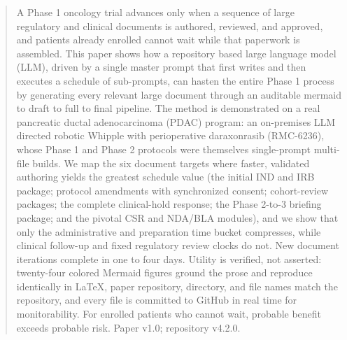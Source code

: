 \begin{abstract}
\noindent
A Phase 1 oncology trial advances only when a sequence of large regulatory and
clinical documents is authored, reviewed, and approved, and patients already
enrolled cannot wait while that paperwork is assembled. This paper shows how a
repository based large language model (LLM), driven by a single master prompt that
first writes and then executes a schedule of sub-prompts, can hasten the entire
Phase 1 process by generating every relevant large document through an auditable
mermaid to draft to full to final pipeline. The method is demonstrated on a real
pancreatic ductal adenocarcinoma (PDAC) program: an on-premises LLM directed
robotic Whipple with perioperative daraxonrasib (RMC-6236), whose Phase 1 and
Phase 2 protocols were themselves single-prompt multi-file builds. We map the six
document targets where faster, validated authoring yields the greatest schedule
value (the initial IND and IRB package; protocol amendments with synchronized
consent; cohort-review packages; the complete clinical-hold response; the
Phase 2-to-3 briefing package; and the pivotal CSR and NDA/BLA modules), and we
show that only the administrative and preparation time bucket compresses, while
clinical follow-up and fixed regulatory review clocks do not. New document
iterations complete in one to four days. Utility is verified, not asserted:
twenty-four colored Mermaid figures ground the prose and reproduce identically in
LaTeX, paper repository, directory, and file names match the repository, and every
file is committed to GitHub in real time for monitorability. For enrolled patients
who cannot wait, probable benefit exceeds probable risk. Paper v1.0; repository
v4.2.0.
\end{abstract}

